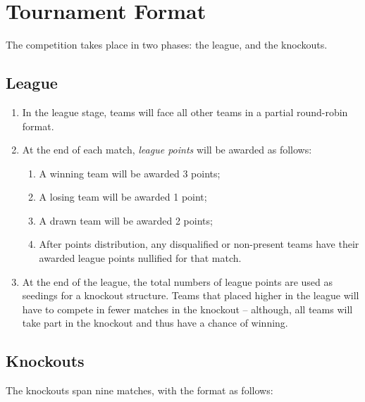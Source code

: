 \section{Tournament Format}

The competition takes place in two phases: the league, and the knockouts.

\subsection{League}

\begin{enumerate}
  \item In the league stage, teams will face all other teams in a
        partial round-robin format.
  \item At the end of each match, \emph{league points} will be awarded as
        follows:
    \begin{enumerate}
      \item A winning team will be awarded 3 points;
      \item A losing team will be awarded 1 point;
      \item A drawn team will be awarded 2 points;
      \item After points distribution, any disqualified or non-present teams
            have their awarded league points nullified for that match.
    \end{enumerate}
  \item At the end of the league, the total numbers of league points are used as
        seedings for a knockout structure. Teams that placed higher in the
        league will have to compete in fewer matches in the knockout --
        although, all teams will take part in the knockout and thus have a
        chance of winning.
\end{enumerate}

\subsection{Knockouts}

The knockouts span nine matches, with the format as follows:

